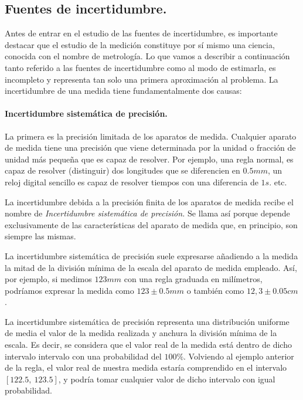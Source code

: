 \begin{paracol}{2}
\subsection{Fuentes de incertidumbre.}

Antes de entrar en el estudio de las fuentes de incertidumbre, es importante destacar que el estudio de la medición constituye por sí mismo una ciencia, conocida con el nombre de metrología. Lo que vamos a describir a continuación tanto referido a las fuentes de incertidumbre como al modo de estimarla, es incompleto y representa tan solo una primera aproximación al problema.
La incertidumbre de una medida tiene fundamentalmente dos causas:

\paragraph{Incertidumbre sistemática de precisión.}
 La primera es la precisión limitada de los aparatos de medida. Cualquier aparato de medida tiene una precisión que viene determinada por la unidad o fracción de unidad más pequeña que es capaz de resolver. Por ejemplo, una regla normal, es capaz de resolver (distinguir) dos longitudes que se diferencien en $0.5 mm$, un reloj digital sencillo es capaz de resolver tiempos con una diferencia de $1s.$ etc.
 
La incertidumbre debida a la precisión finita de los aparatos de medida recibe el nombre de \emph{Incertidumbre sistemática de precisión.} 
Se llama así porque depende exclusivamente de las características del aparato de medida que, en principio, son siempre las mismas.

La incertidumbre sistemática de precisión suele expresarse añadiendo a la medida la mitad de la división mínima de la escala del aparato de medida empleado. Así, por ejemplo, si medimos $123 mm$ con una regla graduada en milímetros, podríamos expresar la  medida como $123 \pm 0.5 mm$ o también como $12,3\pm0.05cm$.


La incertidumbre sistemática de precisión representa una distribución uniforme de media el valor de la medida realizada y anchura la división mínima de la escala. Es decir, se considera que el valor real de la medida está dentro de dicho intervalo intervalo con una probabilidad del $100\%$. Volviendo al ejemplo anterior de la regla, el valor real de nuestra medida estaría comprendido en el intervalo $[122.5,\ 123.5 ]$, y podría tomar cualquier valor de dicho intervalo con igual probabilidad. 


\end{paracol}
